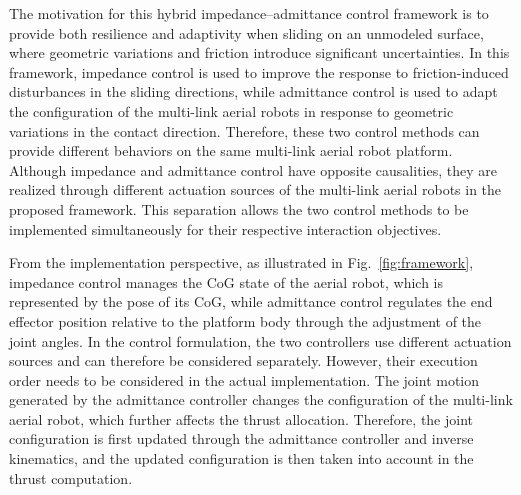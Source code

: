 The motivation for this hybrid impedance--admittance control framework is to provide both resilience and adaptivity when sliding on an unmodeled surface, where geometric variations and friction introduce significant uncertainties. In this framework, impedance control is used to improve the response to friction-induced disturbances in the sliding directions, while admittance control is used to adapt the configuration of the multi-link aerial robots in response to geometric variations in the contact direction. Therefore, these two control methods can provide different behaviors on the same multi-link aerial robot platform. Although impedance and admittance control have opposite causalities, they are realized through different actuation sources of the multi-link aerial robots in the proposed framework. This separation allows the two control methods to be implemented simultaneously for their respective interaction objectives.


From the implementation perspective, as illustrated in Fig.~\ref{fig:framework}, impedance control manages the CoG state of the aerial robot, which is represented by the pose of its CoG, while admittance control regulates the end effector position relative to the platform body through the adjustment of the joint angles. In the control formulation, the two controllers use different actuation sources and can therefore be considered separately. However, their execution order needs to be considered in the actual implementation. The joint motion generated by the admittance controller changes the configuration of the multi-link aerial robot, which further affects the thrust allocation. Therefore, the joint configuration is first updated through the admittance controller and inverse kinematics, and the updated configuration is then taken into account in the thrust computation.


